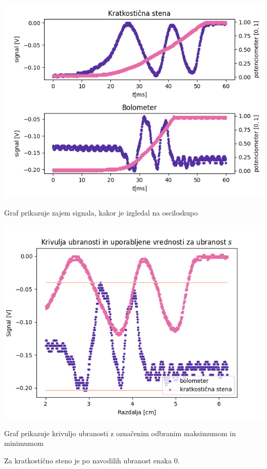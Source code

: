\documentclass[11pt]{article}
\begin{document}
\begin{slika}[H]
\begin{center}
\includegraphics[width=.9\linewidth]{figures/kratkoInBolo}
\end{center}
\caption{\small Graf prikazuje zajem signala, kakor je izgledal na osciloskupo}\label{fig:zajem_signala}
\end{slika}

\begin{slika}[H]
\begin{center}
\includegraphics[width=.9\linewidth]{./figures/krivulja_ubranosti.png}
\end{center}
\caption{\small Graf prikazuje krivuljo ubranosti z označenim odbranim maksimumom
in minimumom}\label{fig:krivulja_ubranosti}
\end{slika}

Za kratkostično steno je po navodilih ubranost enaka 0.
\end{document}
